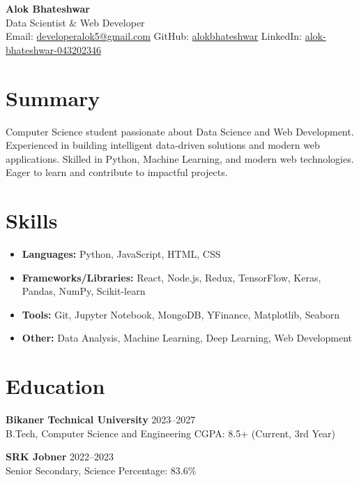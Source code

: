 \documentclass[11pt,a4paper]{article}
\begin{document}
\begin{center}
    {\LARGE \textbf{Alok Bhateshwar}} \\[2pt]
    Data Scientist \& Web Developer \\[2pt]
    Email: \href{mailto:developeralok5@gmail.com}{developeralok5@gmail.com} \quad
    GitHub: \href{https://github.com/alokbhateshwar}{alokbhateshwar} \quad
    LinkedIn: \href{https://www.linkedin.com/in/alok-bhateshwar-043202346}{alok-bhateshwar-043202346}
\end{center}

\section*{Summary}
Computer Science student passionate about Data Science and Web Development. Experienced in building intelligent data-driven solutions and modern web applications. Skilled in Python, Machine Learning, and modern web technologies. Eager to learn and contribute to impactful projects.

\section*{Skills}
\begin{itemize}[leftmargin=*]
    \item \textbf{Languages:} Python, JavaScript, HTML, CSS
    \item \textbf{Frameworks/Libraries:} React, Node.js, Redux, TensorFlow, Keras, Pandas, NumPy, Scikit-learn
    \item \textbf{Tools:} Git, Jupyter Notebook, MongoDB, YFinance, Matplotlib, Seaborn
    \item \textbf{Other:} Data Analysis, Machine Learning, Deep Learning, Web Development
\end{itemize}

\section*{Education}
\textbf{Bikaner Technical University} \hfill 2023--2027 \\
B.Tech, Computer Science and Engineering \hfill CGPA: 8.5+ (Current, 3rd Year)

\textbf{SRK Jobner} \hfill 2022--2023 \\
Senior Secondary, Science \hfill Percentage: 83.6\%
\end{document}
